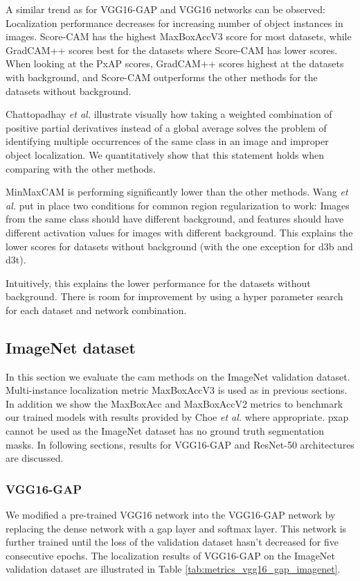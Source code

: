 A similar trend as for VGG16-GAP and VGG16 networks can be observed: Localization performance decreases for increasing number of object instances in images. Score-CAM has the highest MaxBoxAccV3 score for most datasets, while GradCAM++ scores best for the datasets where Score-CAM has lower scores. When looking at the PxAP scores, GradCAM++ scores highest at the datasets with background, and Score-CAM outperforms the other methods for the datasets without background.

Chattopadhay \textit{et al.} \cite{chattopadhyay2017grad} illustrate visually how taking a weighted combination of positive partial derivatives instead of a global average solves the problem of identifying multiple occurrences of the same class in an image and improper object localization. We quantitatively show that this statement holds when comparing with the other methods.

MinMaxCAM is performing significantly lower than the other methods. Wang \textit{et al.} \cite{wang2021minmaxcam} put in place two conditions for common region regularization to work: Images from the same class should have different background, and features should have different activation values for images with different background. This explains the lower scores for datasets without background (with the one exception for d3b and d3t).

Intuitively, this explains the lower performance for the datasets without background. There is room for improvement by using a hyper parameter search for each dataset and network combination.

\subsection{ImageNet dataset}
In this section we evaluate the \acrshort{cam} methods on the ImageNet validation dataset. Multi-instance localization metric MaxBoxAccV3 is used as in previous sections. In addition we show the MaxBoxAcc and MaxBoxAccV2 metrics to benchmark our trained models with results provided by Choe \textit{et al.} \cite{choe2020evaluating} where appropriate. \acrfull{pxap} cannot be used as the ImageNet dataset has no ground truth segmentation masks. In following sections, results for VGG16-GAP and ResNet-50 architectures are discussed.

\subsubsection{VGG16-GAP}
We modified a pre-trained VGG16 network into the VGG16-GAP network by replacing the dense network with a \acrshort{gap} layer and softmax layer. This network is further trained until the loss of the validation dataset hasn't decreased for five consecutive epochs. The localization results of VGG16-GAP on the ImageNet validation dataset are illustrated in Table \ref{tab:metrics_vgg16_gap_imagenet}.

